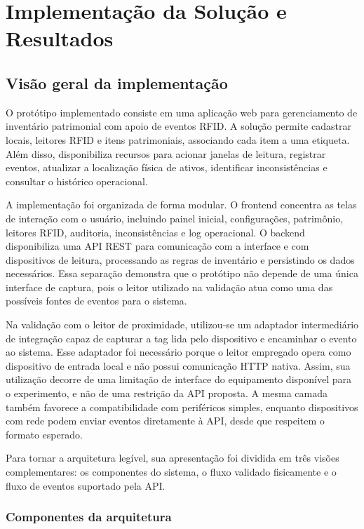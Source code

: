 \chapter{Implementação da Solução e Resultados}

\section{Visão geral da implementação}

O protótipo implementado consiste em uma aplicação web para gerenciamento de inventário patrimonial com apoio de eventos RFID. A solução permite cadastrar locais, leitores RFID e itens patrimoniais, associando cada item a uma etiqueta. Além disso, disponibiliza recursos para acionar janelas de leitura, registrar eventos, atualizar a localização física de ativos, identificar inconsistências e consultar o histórico operacional.

A implementação foi organizada de forma modular. O frontend concentra as telas de interação com o usuário, incluindo painel inicial, configurações, patrimônio, leitores RFID, auditoria, inconsistências e log operacional. O backend disponibiliza uma API REST para comunicação com a interface e com dispositivos de leitura, processando as regras de inventário e persistindo os dados necessários. Essa separação demonstra que o protótipo não depende de uma única interface de captura, pois o leitor utilizado na validação atua como uma das possíveis fontes de eventos para o sistema.

Na validação com o leitor de proximidade, utilizou-se um adaptador intermediário de integração capaz de capturar a tag lida pelo dispositivo e encaminhar o evento ao sistema. Esse adaptador foi necessário porque o leitor empregado opera como dispositivo de entrada local e não possui comunicação HTTP nativa. Assim, sua utilização decorre de uma limitação de interface do equipamento disponível para o experimento, e não de uma restrição da API proposta. A mesma camada também favorece a compatibilidade com periféricos simples, enquanto dispositivos com rede podem enviar eventos diretamente à API, desde que respeitem o formato esperado.

Para tornar a arquitetura legível, sua apresentação foi dividida em três visões complementares: os componentes do sistema, o fluxo validado fisicamente e o fluxo de eventos suportado pela API.

\subsection{Componentes da arquitetura}

